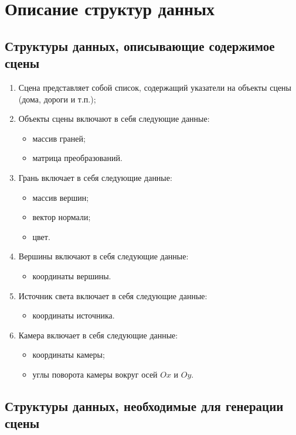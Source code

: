 \section{Описание структур данных}

\subsection*{Структуры данных, описывающие содержимое сцены}

\begin{enumerate}
    \item Сцена представляет собой список, содержащий указатели на объекты сцены (дома, дороги и т.п.);
    \item Объекты сцены включают в себя следующие данные:\begin{itemize}
        \item массив граней;
        \item матрица преобразований.
    \end{itemize}
    \item Грань включает в себя следующие данные: \begin{itemize}
        \item массив вершин;
        \item вектор нормали;
        \item цвет.
    \end{itemize}
    \item Вершины включают в себя следующие данные: \begin{itemize}
        \item координаты вершины.
    \end{itemize}
    \item Источник света включает в себя следующие данные: \begin{itemize}
        \item координаты источника.
    \end{itemize}
    \item Камера включает в себя следующие данные: \begin{itemize}
        \item координаты камеры; 
        \item углы поворота камеры вокруг осей $Ox$ и $Oy$.
    \end{itemize}
\end{enumerate}

\subsection*{Структуры данных, необходимые для генерации сцены}

